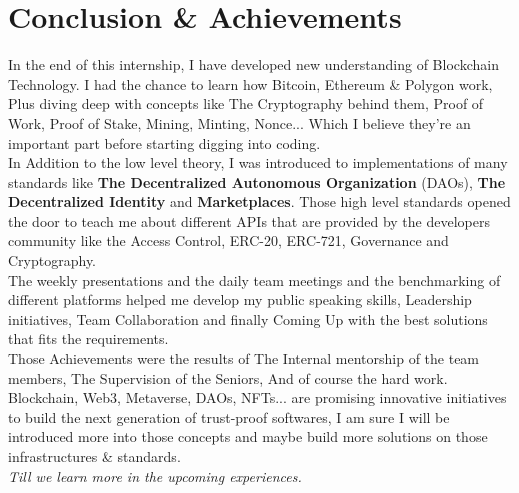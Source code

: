 \chapter{Conclusion \& Achievements}


In the end of this internship, I have developed new understanding of Blockchain Technology. I had the chance to learn how Bitcoin, Ethereum \& Polygon work, Plus diving deep with concepts like The Cryptography behind them, Proof of Work, Proof of Stake, Mining, Minting, Nonce... 
Which I believe they're an important part before starting digging into coding.
\\

\indent In Addition to the low level theory, I was introduced to implementations of many standards like \textbf{The Decentralized Autonomous Organization} (DAOs), \textbf{The Decentralized Identity} and \textbf{Marketplaces}. Those high level standards opened the door to teach me about different APIs that are provided by the developers community like the Access Control, ERC-20, ERC-721, Governance and Cryptography.
\\

\indent The weekly presentations and the daily team meetings and the benchmarking of different platforms helped me develop my public speaking skills, Leadership initiatives, Team Collaboration and finally Coming Up with the best solutions that fits the requirements.
\\

\indent Those Achievements were the results of The Internal mentorship of the team members, The Supervision of the Seniors, And of course the hard work.
\\

\indent Blockchain, Web3, Metaverse, DAOs, NFTs... are promising innovative initiatives to build the next generation of trust-proof softwares, I am sure I will be introduced more into those concepts and maybe build more solutions on those infrastructures \& standards. 
\\

\noindent \textit{Till we learn more in the upcoming experiences.}   



 
 





